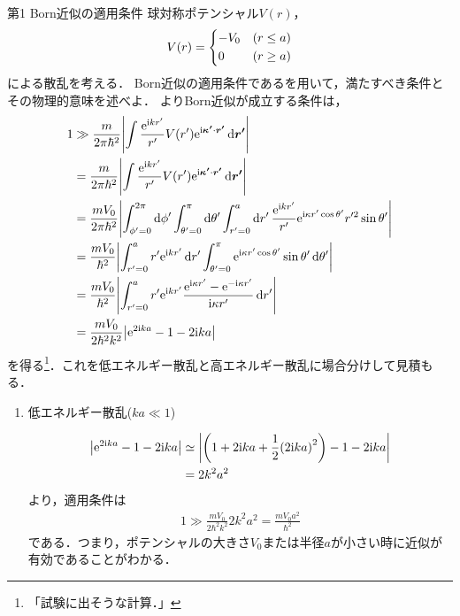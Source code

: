 \documentclass{report}
\begin{document}
  \begin{myex}{第1 Born近似の適用条件}{}
    球対称ポテンシャル$V(r)$，
    \begin{align}
      V(r) = \begin{dcases}
        -V_0 &(r \leq a)\\
        0 &(r \geq a)
      \end{dcases}
    \end{align}
    による散乱を考える．
    Born近似の適用条件であるを用いて，満たすべき条件とその物理的意味を述べよ．
    \tcblower
    よりBorn近似が成立する条件は，%
    \begin{align}
      1 &\gg \frac{m}{2\pi \hbar^2}\abs{\int \frac{\mathrm{e}^{\mathrm{i} kr'}}{r'}V(r')\mathrm{e}^{\mathrm{i}\bm{\kappa'}\cdot\bm{r'}}\dd{\bm{r'}}} \\
      &= \frac{m}{2\pi \hbar^2}\abs{\int \frac{\mathrm{e}^{\mathrm{i} kr'}}{r'}V(r')\mathrm{e}^{\mathrm{i}\bm{\kappa'}\cdot\bm{r'}}\dd{\bm{r'}}} \\
      &= \frac{mV_0}{2\pi \hbar^2}\abs{\int_{\phi' = 0}^{2\pi}\dd{\phi'}\int_{\theta' = 0}^{\pi}\dd{\theta'}\int_{r' = 0}^{a}\dd{r'} \frac{\mathrm{e}^{\mathrm{i} kr'}}{r'}\mathrm{e}^{\mathrm{i} \kappa r'\cos\theta'}r'^2\sin\theta'} \\ 
      &= \frac{mV_0}{\hbar^2}\abs{\int_{r' = 0}^{a}r'\mathrm{e}^{\mathrm{i} kr'}\dd{r'}\int_{\theta' = 0}^{\pi}\mathrm{e}^{\mathrm{i} \kappa r'\cos\theta'}\sin\theta'\dd{\theta'}} \\
      &= \frac{mV_0}{\hbar^2}\abs{\int_{r' = 0}^{a}r'\mathrm{e}^{\mathrm{i} kr'}\frac{\mathrm{e}^{\mathrm{i}\kappa r'} - \mathrm{e}^{-\mathrm{i}\kappa r'}}{\mathrm{i}\kappa r'}\dd{r'}} \\
      &= \frac{mV_0}{2\hbar^2 k^2}\abs{\mathrm{e}^{2\mathrm{i} ka} - 1 - 2\mathrm{i} ka}
    \end{align}
    を得る\footnote{「試験に出そうな計算．」}．これを低エネルギー散乱と高エネルギー散乱に場合分けして見積もる．
    \begin{enumerate}
      \item 低エネルギー散乱($ka \ll 1$)\par
        \begin{align}
          \abs{\mathrm{e}^{2\mathrm{i} ka} - 1 - 2\mathrm{i} ka} &\simeq \abs{\qty(1 + 2\mathrm{i} ka + \frac{1}{2}\qty(2 \mathrm{i} ka)^2) - 1 - 2\mathrm{i} ka}\\
          &= 2k^2 a^2
        \end{align}
        より，適用条件は
        \begin{align}
          1 \gg \frac{mV_0}{2 \hbar^2 k^2}2k^2 a^2 = \frac{mV_0 a^2}{\hbar^2}
        \end{align}
        である．つまり，ポテンシャルの大きさ$V_0$または半径$a$が小さい時に近似が有効であることがわかる．

\end{enumerate}
\end{myex}
\end{document}
